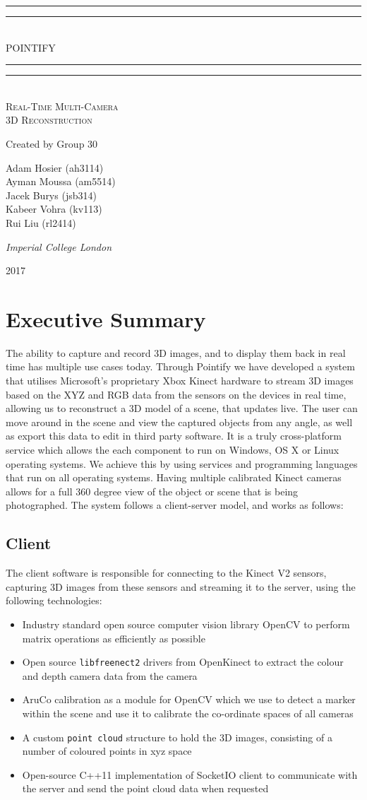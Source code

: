 \documentclass{article}
\newcommand*{\titleGP}{\begingroup %
\centering %
\vspace*{\baselineskip} %

\rule{\textwidth}{1.6pt}\vspace*{-\baselineskip}\vspace*{2pt} %
\rule{\textwidth}{0.4pt}\\[\baselineskip] %

{\LARGE POINTIFY}\\[0.2\baselineskip] %

\rule{\textwidth}{0.4pt}\vspace*{-\baselineskip}\vspace{3.2pt} %
\rule{\textwidth}{1.6pt}\\[\baselineskip] %

\scshape %
Real-Time Multi-Camera\\ 
3D Reconstruction\par

\vspace*{2\baselineskip}

Created by Group 30\\[\baselineskip]
{\Large Adam Hosier (ah3114)\\ Ayman Moussa (am5514) \\Jacek Burys (jsb314) \\Kabeer Vohra (kv113) \\ Rui Liu (rl2414) \\  \par} %

\vspace*{1\baselineskip}
{\itshape Imperial College London\par} %

\vfill 

{\scshape 2017} \\[0.3\baselineskip] %

\endgroup}
\begin{document}
 

\titleGP
\thispagestyle{empty}

\newpage
\setcounter{page}{1}
\tableofcontents

\newpage
\section{Executive Summary}
The ability to capture and record 3D images, and to display them back in real time has multiple use cases today. Through Pointify we have developed a system that utilises Microsoft's proprietary Xbox Kinect hardware to stream 3D images based on the XYZ and RGB data from the sensors on the devices in real time, allowing us to reconstruct a 3D model of a scene, that updates live. The user can move around in the scene and view the captured objects from any angle, as well as export this data to edit in third party software. It is a truly cross-platform service which allows the each component to run on Windows, OS X or Linux operating systems. We achieve this by using services and programming languages that run on all operating systems. Having multiple calibrated Kinect cameras allows for a full 360 degree view of the object or scene that is being photographed. The system follows a client-server model, and works as follows:
\subsection{Client}
The client software is responsible for connecting to the Kinect V2 sensors, capturing 3D images from these sensors and streaming it to the server, using the following technologies:
\begin{itemize}
\item Industry standard open source computer vision library OpenCV to perform matrix operations as efficiently as possible
\item Open source \texttt{libfreenect2} drivers from OpenKinect to extract the colour and depth camera data from the camera
\item AruCo calibration as a module for OpenCV which we use to detect a marker within the scene and use it to calibrate the co-ordinate spaces of all cameras
\item A custom \texttt{point cloud} structure to hold the 3D images, consisting of a number of coloured points in xyz space
\item Open-source C++11 implementation of SocketIO client to communicate with the server and send the point cloud data when requested
\end{itemize}
\end{document}
